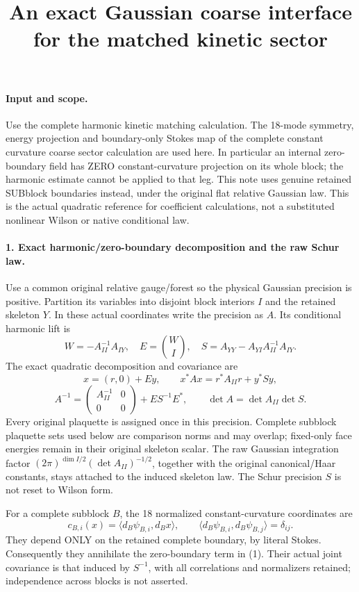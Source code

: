 \documentclass[11pt]{article}
\title{An exact Gaussian coarse interface for the matched kinetic sector}\author{}\date{}
\begin{document}
\maketitle
\paragraph{Input and scope.}
Use the complete harmonic kinetic matching calculation. The 18-mode symmetry, energy projection and
boundary-only Stokes map of the complete constant curvature coarse sector calculation are used here. In particular
an internal zero-boundary field has ZERO constant-curvature projection on
its whole block; the harmonic estimate cannot be applied to that leg.
This note uses genuine retained SUBblock boundaries instead, under the
original flat relative Gaussian law. This is the actual quadratic
reference for coefficient calculations, not a substituted nonlinear
Wilson or native conditional law.

\paragraph{1. Exact harmonic/zero-boundary decomposition and the raw Schur law.}
Use a common original relative gauge/forest so the physical Gaussian
precision is positive. Partition its variables into disjoint block
interiors $I$ and the retained skeleton $Y$. In these actual coordinates
write the precision as $A$. Its conditional harmonic lift is
\[
 W=-A_{II}^{-1}A_{IY},\quad E=\binom W I,\quad
 S=A_{YY}-A_{YI}A_{II}^{-1}A_{IY}.
\]
The exact quadratic decomposition and covariance are
\[
 x=(r,0)+Ey,\qquad
 x^*Ax=r^*A_{II}r+y^*Sy,
\]
\[
 \boxed{A^{-1}=\begin{pmatrix}A_{II}^{-1}&0\\0&0\end{pmatrix}
                                  +ES^{-1}E^*,\qquad
        \det A=\det A_{II}\det S.}                              \tag{1}
\]
Every original plaquette is assigned once in this precision. Complete
subblock plaquette sets used below are comparison norms and may overlap;
fixed-only face energies remain in their original skeleton scalar.
The raw Gaussian integration factor
$(2\pi)^{\dim I/2}(\det A_{II})^{-1/2}$, together with the original
canonical/Haar constants, stays attached to the induced skeleton law.
The Schur precision $S$ is not reset to Wilson form.

For a complete subblock $B$, the 18 normalized constant-curvature
coordinates are
\[
 c_{B,i}(x)=\langle d_B\psi_{B,i},d_Bx\rangle,
 \qquad\langle d_B\psi_{B,i},d_B\psi_{B,j}\rangle=\delta_{ij}.
\]
They depend ONLY on the retained complete boundary, by literal Stokes.
Consequently they annihilate the zero-boundary term in (1). Their actual
joint covariance is that induced by $S^{-1}$, with all correlations and
normalizers retained; independence across blocks is not asserted.
\end{document}
